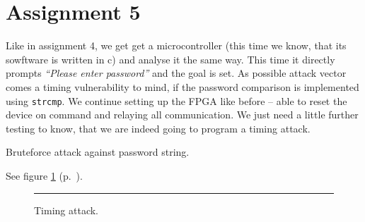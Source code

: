 \section*{Assignment 5}
%
% 

Like in assignment 4, we get get a microcontroller (this time we know, that its sowftware is written in c) and analyse it the same way. 
This time it directly prompts \textit{``Please enter password''} and the goal is set. As possible attack vector comes a timing vulnerability to mind, if the password comparison is implemented using \texttt{strcmp}. We continue setting up the FPGA like before -- able to reset the device on command and relaying all communication. We just need a little further testing to know, that we are indeed going to program a timing attack.

Bruteforce attack against password string. 

See figure \ref{fig:as5-schematic} (p.~\pageref{fig:as5-schematic}).

\begin{figure}[tb]
    \begin{center}
        
        \caption{Timing attack.}
        \label{fig:as5-schematic}
        \vspace{1em}\hrule
    \end{center}
\end{figure}
